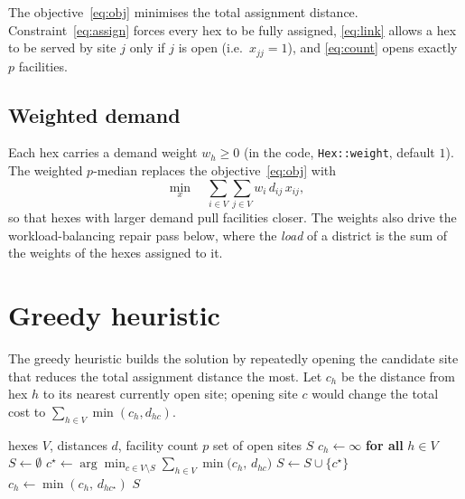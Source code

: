 \documentclass[11pt]{article}
\begin{document}
The objective~\eqref{eq:obj} minimises the total assignment distance.
Constraint~\eqref{eq:assign} forces every hex to be fully assigned,
\eqref{eq:link} allows a hex to be served by site $j$ only if $j$ is open
(i.e.\ $x_{jj} = 1$), and \eqref{eq:count} opens exactly $p$ facilities.

\subsection*{Weighted demand}

Each hex carries a demand weight $w_h \ge 0$ (in the code, \texttt{Hex::weight},
default $1$). The weighted $p$-median replaces the objective~\eqref{eq:obj} with
\[
  \min_{x} \quad \sum_{i \in V} \sum_{j \in V} w_i\, d_{ij}\, x_{ij},
\]
so that hexes with larger demand pull facilities closer. The weights also drive
the workload-balancing repair pass below, where the \emph{load} of a district is
the sum of the weights of the hexes assigned to it.

\section{Greedy heuristic}

The greedy heuristic builds the solution by repeatedly opening the candidate
site that reduces the total assignment distance the most. Let $c_h$ be the
distance from hex $h$ to its nearest currently open site; opening site $c$ would
change the total cost to $\sum_{h \in V} \min(c_h, d_{hc})$.

\begin{algorithm}[h]
\caption{Greedy $p$-median (site selection)}
\label{alg:greedy}
\begin{algorithmic}[1]
  \Require hexes $V$, distances $d$, facility count $p$
  \Ensure set of open sites $S$
  \State $c_h \gets \infty$ \textbf{ for all } $h \in V$
  \State $S \gets \emptyset$
    \State $c^\star \gets \displaystyle\arg\min_{c \in V \setminus S}
            \sum_{h \in V} \min\!\big(c_h,\, d_{hc}\big)$
    \State $S \gets S \cup \{c^\star\}$
      \State $c_h \gets \min(c_h,\, d_{h c^\star})$
    \EndFor
  \EndFor
  \State \Return $S$
\end{algorithmic}
\end{algorithm}
\end{document}
